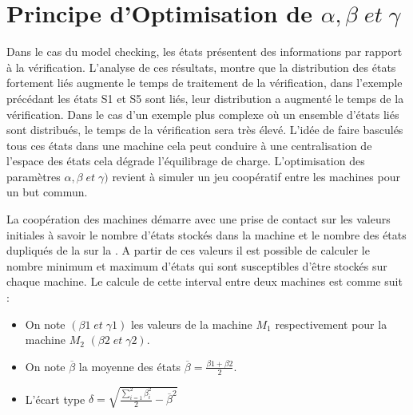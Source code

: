 
\section{Principe d'Optimisation de $\alpha, \beta\; et\; \gamma$}
 
Dans le cas du model checking, les \'{e}tats pr\'{e}sentent des informations par rapport \`{a} la v\'{e}rification. L’analyse de ces r\'{e}sultats, montre que la distribution des \'{e}tats fortement li\'{e}s augmente le temps de traitement de la vérification, dans l'exemple pr\'{e}c\'{e}dant les \'{e}tats S1 et S5 sont li\'{e}s, leur distribution a augment\'{e} le temps de la vérification. Dans le cas d'un exemple plus complexe o\`{u} un ensemble d’\'{e}tats li\'{e}s sont distribu\'{e}s, le temps de la vérification sera très \'{e}lev\'{e}. L’id\'{e}e de faire basculés tous ces \'{e}tats dans une machine cela peut conduire \`{a} une centralisation de l'espace des états cela dégrade l'équilibrage de charge. L'optimisation des param\`{e}tres $\alpha, \beta \; et\; \gamma)$ revient \`{a} simuler un jeu coop\'{e}ratif entre les machines pour un but commun. 

La coop\'{e}ration des machines d\'{e}marre avec une prise de contact sur les valeurs initiales à savoir le nombre d’\'{e}tats stockés dans la machine et le nombre des états dupliqués de la \mi{} sur la \mj{}. A partir de ces valeurs il est possible de calculer le nombre minimum et maximum d’\'{e}tats qui sont susceptibles d’\^{e}tre stockés sur chaque machine. Le calcule de cette interval entre deux machines est comme suit :

\begin{itemize}
	\item  	On note $(\beta1 \; et\; \gamma1)$ les valeurs de la machine $M_1$ respectivement pour la machine $M_2$ $(\beta2 \;et\; \gamma2)$.
	\item  	On note $\overline{\beta}$ la moyenne des \'{e}tats $\overline{\beta}=\frac{\beta1+\beta2}{2}$.
	\item  	L’\'{e}cart type $\delta=\sqrt{\frac{\displaystyle\sum_{i=1}^{2}\beta_i^2 }{2}-\overline{\beta}^2} $
\end{itemize}

